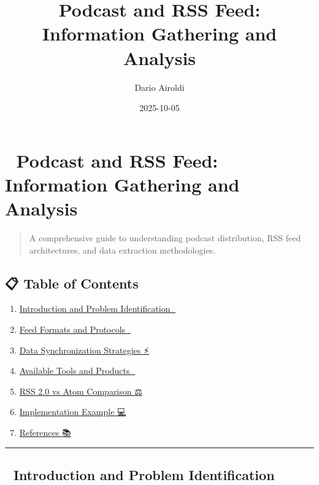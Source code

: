 \documentclass[
  letterpaper,
  DIV=11,
  numbers=noendperiod]{scrartcl}
\title{Podcast and RSS Feed: Information Gathering and Analysis}
\author{Dario Airoldi}
\date{2025-10-05}
\providecommand{\tightlist}{%
  \setlength{\itemsep}{0pt}\setlength{\parskip}{0pt}}\usepackage{longtable,booktabs,array}
\renewcommand*\contentsname{Table of contents}
\newcommand\contentsname{Table of contents}
\begin{document}
\maketitle

\renewcommand*\contentsname{Table of contents}
{
\hypersetup{linkcolor=}
\setcounter{tocdepth}{3}
\tableofcontents
}

\section{📡 Podcast and RSS Feed: Information Gathering and
Analysis}\label{podcast-and-rss-feed-information-gathering-and-analysis}

\begin{quote}
A comprehensive guide to understanding podcast distribution, RSS feed
architectures, and data extraction methodologies.
\end{quote}

\subsection{📋 Table of Contents}\label{table-of-contents}

\begin{enumerate}
\def\labelenumi{\arabic{enumi}.}
\tightlist
\item
  \hyperref[introduction-and-problem-identification]{Introduction and
  Problem Identification 🎯}
\item
  \hyperref[feed-formats-and-protocols]{Feed Formats and Protocols 📁}
\item
  \hyperref[data-synchronization-strategies]{Data Synchronization
  Strategies ⚡}
\item
  \hyperref[available-tools-and-products]{Available Tools and Products
  🔧}
\item
  \hyperref[rss-20-vs-atom-comparison]{RSS 2.0 vs Atom Comparison ⚖️}
\item
  \hyperref[implementation-example]{Implementation Example 💻}
\item
  \hyperref[references]{References 📚}
\end{enumerate}

\begin{center}\rule{0.5\linewidth}{0.5pt}\end{center}

\subsection{🎯 Introduction and Problem
Identification}\label{introduction-and-problem-identification}
\end{document}
